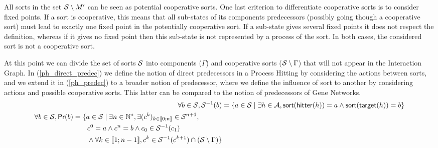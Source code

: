 All sorts in the set $\mathcal{S} \setminus M'$ can be seen as potential cooperative sorts. One last criterion to differentiate cooperative sorts is to consider fixed points. If a sort is cooperative, this means that all sub-states of its components predecessors (possibly going though a cooperative sort) must lead to exactly one fixed point in the potentially cooperative sort. If a sub-state gives several fixed points it does not respect the definition, whereas if it gives no fixed point then this sub-state is not represented by a process of the sort. In both cases, the considered sort is not a cooperative sort.


At this point we can divide the set of sorts $\mathcal{S}$ into components ($\Gamma$) and cooperative sorts ($\mathcal{S} \setminus \Gamma$) that will not appear in the Interaction Graph. In (\ref{ph_direct_predec}) we define the notion of direct predecessors in a Process Hitting by considering the actions between sorts, and we extend it in (\ref{ph_predec}) to a broader notion of predecessor, where we define the influence of sort to another by considering actions and possible cooperative sorts. This latter can be compared to the notion of predecessors of Gene Networks.
\begin{align}
\label{ph_direct_predec}
  \forall b \in \mathcal{S}, \mathcal{S}^{-1}(b) &= \{a \in \mathcal{S} \mid \exists h \in \mathcal{A}, \mathsf{sort}(\mathsf{hitter}(h)) = a \wedge \mathsf{sort}(\mathsf{target}(h)) = b\} \\
\begin{split}\label{ph_predec}
  \forall b \in \mathcal{S}, \mathsf{Pr}(b) &= \{a \in \mathcal{S} \mid \exists n \in \mathbb{N}^*, \exists (c^k)_{k \in \llbracket 0 ; n \rrbracket} \in \mathcal{S}^{n+1}, \\
                                   & \quad \quad c^0 = a \wedge c^n = b \wedge c_0 \in \mathcal{S}^{-1}(c_1) \\
                                   & \quad \quad \wedge \forall k \in \llbracket 1 ; n-1 \rrbracket, c^k \in \mathcal{S}^{-1}(c^{k+1}) \cap (\mathcal{S}\setminus\Gamma)\}
\end{split}
\end{align}

